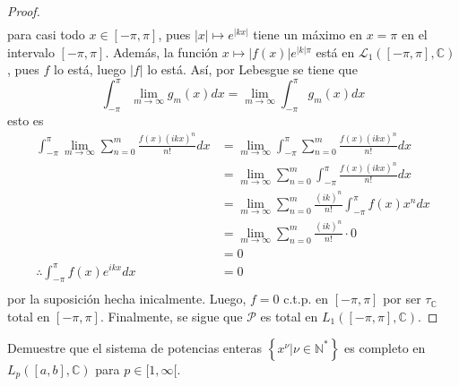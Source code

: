 \documentclass[12pt]{report}
\theoremstyle{largebreak}
\newcommand\abs[1]{\ensuremath{\left|#1\right|}}
\begin{document}
\begin{proof}
\begin{equation*}
\begin{split}
            \end{split}
        \end{equation*}
        para casi todo $x\in[-\pi,\pi]$, pues $\abs{x}\mapsto e^{\abs{kx}}$ tiene un máximo en $x=\pi$ en el intervalo $[-\pi,\pi]$. Además, la función $x\mapsto \abs{f(x)}e^{\abs{k}\pi}$ está en $\mathcal{L}_1([-\pi,\pi],\mathbb{C})$, pues $f$ lo está, luego $\abs{f}$ lo está. Así, por Lebesgue se tiene que
        \begin{equation*}
            \int_{ -\pi}^{\pi}\lim_{ m\rightarrow\infty}g_m(x)dx=\lim_{ m\rightarrow\infty}\int_{ -\pi}^{\pi} g_m(x)dx
        \end{equation*}
        esto es
        \begin{equation*}
            \begin{split}
                \int_{-\pi}^\pi\lim_{ m\rightarrow\infty}\sum_{ n=0}^m\frac{f(x)(ikx)^n}{n!}dx&=\lim_{ m\rightarrow\infty}\int_{ -\pi}^{\pi}\sum_{ n=0}^m\frac{f(x)(ikx)^n}{n!}dx\\
                &=\lim_{ m\rightarrow\infty}\sum_{ n=0}^m\int_{ -\pi}^{\pi}\frac{f(x)(ikx)^n}{n!}dx\\
                &=\lim_{ m\rightarrow\infty}\sum_{ n=0}^m\frac{(ik)^n}{n!}\int_{ -\pi}^{\pi}f(x)x^n dx\\
                &=\lim_{ m\rightarrow\infty}\sum_{ n=0}^m\frac{(ik)^n}{n!}\cdot0 \\
                &=0\\
                \therefore \int_{-\pi}^\pi f(x)e^{ ikx}dx&=0\\
            \end{split}
        \end{equation*}
        por la suposición hecha inicalmente. Luego, $f=0$ c.t.p. en $[-\pi,\pi]$ por ser $\tau_{\mathbb{C}}$ total en $[-\pi,\pi]$. Finalmente, se sigue que $\mathcal{P}$ es total en $L_1([-\pi,\pi],\mathbb{C})$.
    \end{proof}

    \begin{excer}
        Demuestre que el sistema de potencias enteras $\left\{x^\nu\Big|\nu\in\mathbb{N}^* \right\}$ es completo en $L_p([a,b],\mathbb{C})$ para $p\in[1,\infty[$.
    \end{excer}
\end{document}
